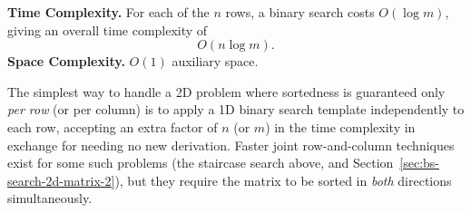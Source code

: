 \begin{complexitybox}
\textbf{Time Complexity.} For each of the $n$ rows, a binary search costs
$O(\log m)$, giving an overall time complexity of
\[
  O(n \log m).
\]
\textbf{Space Complexity.} $O(1)$ auxiliary space.
\end{complexitybox}

\begin{takeawaybox}
The simplest way to handle a 2D problem where sortedness is guaranteed
only \emph{per row} (or per column) is to apply a 1D binary search
template independently to each row, accepting an extra factor of $n$ (or
$m$) in the time complexity in exchange for needing no new derivation.
Faster joint row-and-column techniques exist for some such problems (the
staircase search above, and Section~\ref{sec:bs-search-2d-matrix-2}), but
they require the matrix to be sorted in \emph{both} directions
simultaneously.
\end{takeawaybox}
